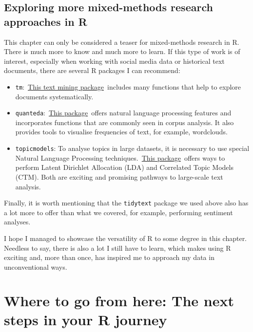 \documentclass[
]{book}
\begin{document}
\hypertarget{exploring-more-mixed-methods-research-approaches-in-r}{%
\section{Exploring more mixed-methods research approaches in R}\label{exploring-more-mixed-methods-research-approaches-in-r}}

This chapter can only be considered a teaser for mixed-methods research in R. There is much more to know and much more to learn. If this type of work is of interest, especially when working with social media data or historical text documents, there are several R packages I can recommend:

\begin{itemize}
\item
  \texttt{tm}:~\href{http://tm.r-forge.r-project.org}{This text mining package}~includes many functions that help to explore documents systematically.
\item
  \texttt{quanteda}:~\href{https://quanteda.io}{This package}~offers natural language processing features and incorporates functions that are commonly seen in corpus analysis. It also provides tools to visualise frequencies of text, for example, wordclouds.
\item
  \texttt{topicmodels}: To analyse topics in large datasets, it is necessary to use special Natural Language Processing techniques.~\href{https://cran.r-project.org/web/packages/topicmodels/index.html}{This package}~offers ways to perform Latent Dirichlet Allocation (LDA) and Correlated Topic Models (CTM). Both are exciting and promising pathways to large-scale text analysis.
\end{itemize}

Finally, it is worth mentioning that the \texttt{tidytext} package we used above also has a lot more to offer than what we covered, for example, performing sentiment analyses.

I hope I managed to showcase the versatility of R to some degree in this chapter. Needless to say, there is also a lot I still have to learn, which makes using R exciting and, more than once, has inspired me to approach my data in unconventional ways.

\hypertarget{next-steps}{%
\chapter{Where to go from here: The next steps in your R journey}\label{next-steps}}
\end{document}
